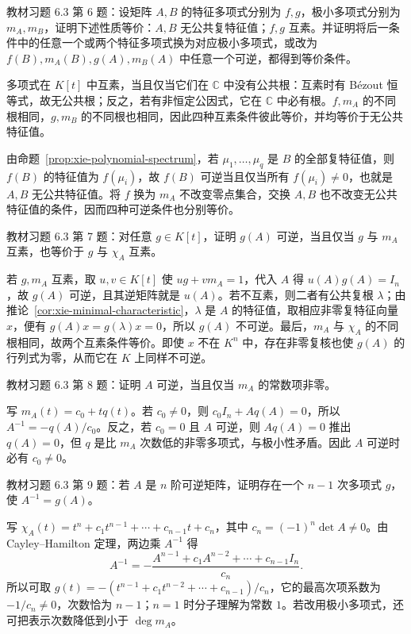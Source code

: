 \begin{example}
\label{ex:xie-63-06}
教材习题 6.3 第 6 题：设矩阵 $A,B$ 的特征多项式分别为 $f,g$，极小多项式分别为 $m_A,m_B$，证明下述性质等价：$A,B$ 无公共复特征值；$f,g$ 互素。并证明将后一条件中的任意一个或两个特征多项式换为对应极小多项式，或改为 $f(B),m_A(B),g(A),m_B(A)$ 中任意一个可逆，都得到等价条件。
\end{example}
\begin{solve}
多项式在 $K[t]$ 中互素，当且仅当它们在 $\mathbb C$ 中没有公共根：互素时有 Bézout 恒等式，故无公共根；反之，若有非恒定公因式，它在 $\mathbb C$ 中必有根。$f,m_A$ 的不同根相同，$g,m_B$ 的不同根也相同，因此四种互素条件彼此等价，并均等价于无公共特征值。

由命题~\ref{prop:xie-polynomial-spectrum}，若 $\mu_1,\ldots,\mu_q$ 是 $B$ 的全部复特征值，则 $f(B)$ 的特征值为 $f(\mu_i)$，故 $f(B)$ 可逆当且仅当所有 $f(\mu_i)\ne0$，也就是 $A,B$ 无公共特征值。将 $f$ 换为 $m_A$ 不改变零点集合，交换 $A,B$ 也不改变无公共特征值的条件，因而四种可逆条件也分别等价。
\end{solve}

\begin{example}
\label{ex:xie-63-07}
教材习题 6.3 第 7 题：对任意 $g\in K[t]$，证明 $g(A)$ 可逆，当且仅当 $g$ 与 $m_A$ 互素，也等价于 $g$ 与 $\chi_A$ 互素。
\end{example}
\begin{solve}
若 $g,m_A$ 互素，取 $u,v\in K[t]$ 使 $ug+vm_A=1$，代入 $A$ 得 $u(A)g(A)=I_n$，故 $g(A)$ 可逆，且其逆矩阵就是 $u(A)$。若不互素，则二者有公共复根 $\lambda$；由推论~\ref{cor:xie-minimal-characteristic}，$\lambda$ 是 $A$ 的特征值，取相应非零复特征向量 $x$，便有 $g(A)x=g(\lambda)x=0$，所以 $g(A)$ 不可逆。最后，$m_A$ 与 $\chi_A$ 的不同根相同，故两个互素条件等价。即使 $x$ 不在 $K^n$ 中，存在非零复核也使 $g(A)$ 的行列式为零，从而它在 $K$ 上同样不可逆。
\end{solve}

\begin{example}
\label{ex:xie-63-08}
教材习题 6.3 第 8 题：证明 $A$ 可逆，当且仅当 $m_A$ 的常数项非零。
\end{example}
\begin{solve}
写 $m_A(t)=c_0+tq(t)$。若 $c_0\ne0$，则 $c_0I_n+Aq(A)=0$，所以 $A^{-1}=-q(A)/c_0$。反之，若 $c_0=0$ 且 $A$ 可逆，则 $Aq(A)=0$ 推出 $q(A)=0$，但 $q$ 是比 $m_A$ 次数低的非零多项式，与极小性矛盾。因此 $A$ 可逆时必有 $c_0\ne0$。
\end{solve}

\begin{example}
\label{ex:xie-63-09}
教材习题 6.3 第 9 题：若 $A$ 是 $n$ 阶可逆矩阵，证明存在一个 $n-1$ 次多项式 $g$，使 $A^{-1}=g(A)$。
\end{example}
\begin{solve}
写 $\chi_A(t)=t^n+c_1t^{n-1}+\cdots+c_{n-1}t+c_n$，其中 $c_n=(-1)^n\det A\ne0$。由 Cayley--Hamilton 定理，两边乘 $A^{-1}$ 得
\[
 A^{-1}=-\frac{A^{n-1}+c_1A^{n-2}+\cdots+c_{n-1}I_n}{c_n}.
\]
所以可取 $g(t)=-(t^{n-1}+c_1t^{n-2}+\cdots+c_{n-1})/c_n$，它的最高次项系数为 $-1/c_n\ne0$，次数恰为 $n-1$；$n=1$ 时分子理解为常数 $1$。若改用极小多项式，还可把表示次数降低到小于 $\deg m_A$。
\end{solve}

